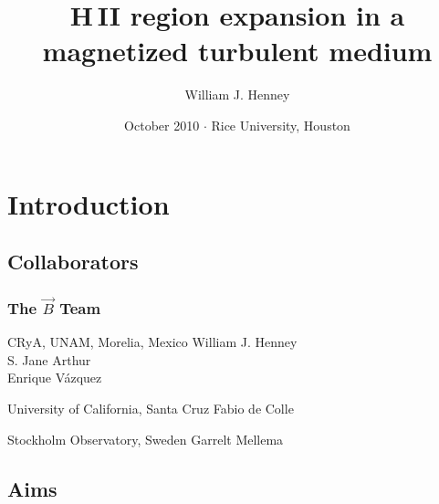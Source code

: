 \documentclass{beamer}
\title{H\,II region expansion in a magnetized turbulent medium}
\author
{
  William J. Henney
}
\institute[CRyA, UNAM]
{
  \structure{Centro de Radioastronomía y Astrofísica\\
  UNAM, Morelia, México}
}
\date{October 2010 \(\cdot\) Rice University, Houston}
\begin{document}
\begin{frame}
  \titlepage
\end{frame}


\section{Introduction}

\newlength\photowidth
\setlength\photowidth{1.2cm}

\subsection{Collaborators}


\begin{frame}
  \frametitle{The \boldmath\(\vec{B}\) Team}
  \begin{block}{CRyA, UNAM, Morelia, Mexico}
    William J. Henney\hfill {}\hspace*{2\photowidth}~\\
    \smallskip
    \quad S. Jane Arthur\hfill {}\hspace*{\photowidth}~\\
    \smallskip
    \quad\quad Enrique Vázquez\hfill {}\\
  \end{block}

  \begin{block}{University of California, Santa Cruz}
    Fabio de Colle\hfill {}
  \end{block}
  \begin{block}{Stockholm Observatory, Sweden}
    Garrelt Mellema\hfill {}\hspace*{\photowidth}~
  \end{block}

\end{frame}

\subsection{Aims}
\end{document}
